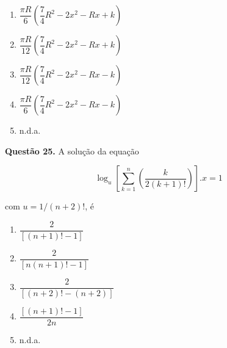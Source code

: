 \documentclass[11pt]{article}
\begin{document}
\begin{enumerate}[\bf A (\quad)]
    \item $\dfrac{\pi R}{6} \left( \dfrac{7}{4}R^2 - 2x^2 - Rx + k \right)$
    \item $\dfrac{\pi R}{12} \left( \dfrac{7}{4}R^2 - 2x^2 - Rx + k \right)$
    \item $\dfrac{\pi R}{12} \left( \dfrac{7}{4}R^2 - 2x^2 - Rx - k \right)$
    \item $\dfrac{\pi R}{6} \left( \dfrac{7}{4}R^2 - 2x^2 - Rx - k \right)$
    \item n.d.a.
\end{enumerate}



\textbf{Questão 25.} A  solução  da  equação 

$$
\log_u \left[ \sum\limits_{k=1}^{n} \left( \frac{k}{2(k+1)!} \right) \right].x = 1
$$

com $u = 1/(n+2)!$, é  

\begin{multicols}{3}
    \begin{enumerate}[\bf A (\quad)]
        \item $\dfrac{2}{[(n + 1)! - 1]}$
        \item $\dfrac{2}{[n(n + 1)! - 1]}$
        \item $\dfrac{2}{[(n + 2)! - (n + 2)]}$
        \item $\dfrac{[(n + 1)! - 1]}{2n}$
        \item n.d.a.
    \end{enumerate}
\end{multicols}
\end{document}
